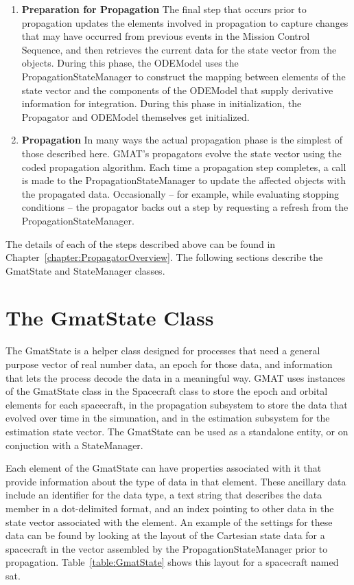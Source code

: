 \begin{enumerate}
\item \textbf{Preparation for Propagation}  The final step that occurs prior to propagation updates
the elements involved in propagation to capture changes that may have occurred from previous
events in the Mission Control Sequence, and then retrieves the current data for the state vector
from the objects.  During this phase, the ODEModel uses the PropagationStateManager to construct the
mapping between elements of the state vector and the components of the ODEModel that supply
derivative information for integration.  During this phase in initialization, the Propagator and
ODEModel themselves get initialized.

\item \textbf{Propagation}  In many ways the actual propagation phase is the simplest of those
described here.  GMAT's propagators evolve the state vector using the coded propagation algorithm.
Each time a propagation step completes, a call is made to the PropagationStateManager to update the
affected objects with the propagated data.  Occasionally -- for example, while evaluating stopping
conditions -- the propagator backs out a step by requesting a refresh from the
PropagationStateManager.
\end{enumerate}

The details of each of the steps described above can be found in
Chapter~\ref{chapter:PropagatorOverview}.  The following sections describe the GmatState and
StateManager classes.


\section{The GmatState Class}

The GmatState is a helper class designed for processes that need a general purpose vector of real
number data, an epoch for those data, and information that lets the process decode the data in a
meaningful way.  GMAT uses instances of the GmatState class in the Spacecraft class to store the
epoch and orbital elements for each spacecraft, in the propagation subsystem to store the data that
evolved over time in the simunation, and in the estimation subsystem for the estimation state
vector.  The GmatState can be used as a standalone entity, or on conjuction with a StateManager.

Each element of the GmatState can have properties associated with it that provide information about
the type of data in that element.  These ancillary data include an identifier for the data type,
a text string that describes the data member in a dot-delimited format, and an index pointing to
other data in the state vector associated with the element.  An example of the settings for these
data can be found by looking at the layout of the Cartesian state data for a spacecraft in the
vector assembled by the PropagationStateManager prior to propagation.  Table~\ref{table:GmatState}
shows this layout for a spacecraft named sat.

